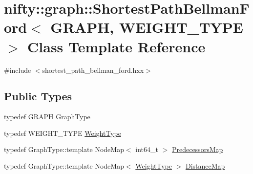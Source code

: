 \hypertarget{classnifty_1_1graph_1_1ShortestPathBellmanFord}{}\section{nifty\+:\+:graph\+:\+:Shortest\+Path\+Bellman\+Ford$<$ G\+R\+A\+PH, W\+E\+I\+G\+H\+T\+\_\+\+T\+Y\+PE $>$ Class Template Reference}
\label{classnifty_1_1graph_1_1ShortestPathBellmanFord}


{\ttfamily \#include $<$shortest\+\_\+path\+\_\+bellman\+\_\+ford.\+hxx$>$}

\subsection*{Public Types}
\begin{DoxyCompactItemize}
\item 
typedef G\+R\+A\+PH \hyperlink{classnifty_1_1graph_1_1ShortestPathBellmanFord_a927d9f2cee4c4f0f6e87df05de2af6bb}{Graph\+Type}
\item 
typedef W\+E\+I\+G\+H\+T\+\_\+\+T\+Y\+PE \hyperlink{classnifty_1_1graph_1_1ShortestPathBellmanFord_a0455c814a964983fe8b43278bb7528e8}{Weight\+Type}
\item 
typedef Graph\+Type\+::template Node\+Map$<$ int64\+\_\+t $>$ \hyperlink{classnifty_1_1graph_1_1ShortestPathBellmanFord_a9eca03af1ee4e886ed7da46dae5d5703}{Predecessors\+Map}
\item 
typedef Graph\+Type\+::template Node\+Map$<$ \hyperlink{classnifty_1_1graph_1_1ShortestPathBellmanFord_a0455c814a964983fe8b43278bb7528e8}{Weight\+Type} $>$ \hyperlink{classnifty_1_1graph_1_1ShortestPathBellmanFord_a00b64f4bc8316d99c4f029b2b37da74c}{Distance\+Map}
\end{DoxyCompactItemize}
